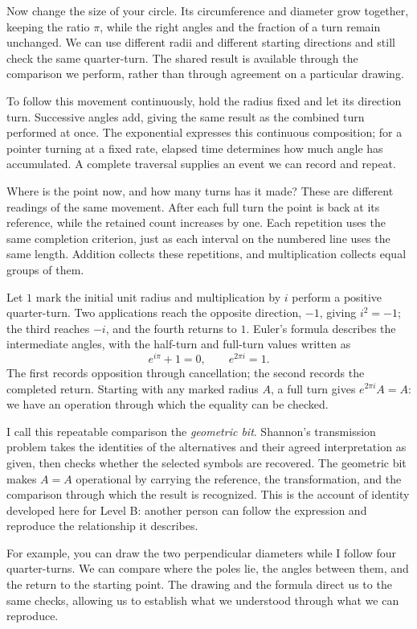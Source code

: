 \documentclass[11pt,a4paper]{article}
\theoremstyle{definition}
\begin{document}
Now change the size of your circle. Its circumference and diameter
grow together, keeping the ratio $\pi$, while the right angles and
the fraction of a turn remain unchanged. We can use different
radii and different starting directions and still check the same
quarter-turn. The shared result is available through the comparison
we perform, rather than through agreement on a particular drawing.

To follow this movement continuously, hold the radius fixed and
let its direction turn. Successive angles add, giving the same
result as the combined turn performed at once. The exponential
expresses this continuous composition; for a pointer turning at
a fixed rate, elapsed time determines how much angle has accumulated.
A complete traversal supplies an event we can record and repeat.

Where is the point now, and how many turns has it made? These are
different readings of the same movement. After each full turn the
point is back at its reference, while the retained count increases
by one. Each repetition uses the same completion criterion, just
as each interval on the numbered line uses the same length.
Addition collects these repetitions, and multiplication collects
equal groups of them.

Let $1$ mark the initial unit radius and multiplication by $i$
perform a positive quarter-turn. Two applications reach the opposite
direction, $-1$, giving $i^2=-1$; the third reaches $-i$, and the
fourth returns to $1$. Euler's formula describes the intermediate
angles, with the half-turn and full-turn values written as
\[
 e^{i\pi}+1=0,\qquad e^{2\pi i}=1.
\]
The first records opposition through cancellation; the second
records the completed return. Starting with any marked radius $A$,
a full turn gives $e^{2\pi i}A=A$: we have an operation through
which the equality can be checked.

I call this repeatable comparison the \emph{geometric bit}.
Shannon's transmission problem takes the identities of the
alternatives and their agreed interpretation as given, then checks
whether the selected symbols are recovered. The geometric bit
makes $A=A$ operational by carrying the reference, the transformation,
and the comparison through which the result is recognized.
This is the account of identity developed here for Level B:
another person can follow the expression and reproduce the
relationship it describes.

For example, you can draw the two perpendicular diameters while
I follow four quarter-turns. We can compare where the poles lie,
the angles between them, and the return to the starting point.
The drawing and the formula direct us to the same checks, allowing
us to establish what we understood through what we can reproduce.
\end{document}
